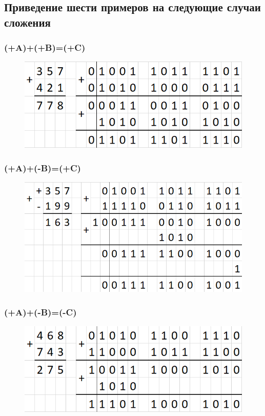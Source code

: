 \documentclass[a4paper,14pt]{article}
\begin{document}
\subsection{Приведение шести примеров на следующие случаи сложения}

\subsubsection{(+A)+(+B)=(+C)}

\begin{figure}[H]
	\centering
	\includegraphics[width=0.7\linewidth]{images/ex1}
	\caption{}
	\label{fig:ex1}
\end{figure}



\subsubsection{(+A)+(-B)=(+C)}

\begin{figure}[H]
	\centering
	\includegraphics[width=0.7\linewidth]{images/ex2}
	\caption{}
	\label{fig:ex2}
\end{figure}



\subsubsection{(+A)+(-B)=(-C)}

\begin{figure}[H]
	\centering
	\includegraphics[width=0.7\linewidth]{images/ex3}
	\caption{}
	\label{fig:ex3}
\end{figure}
\end{document}
